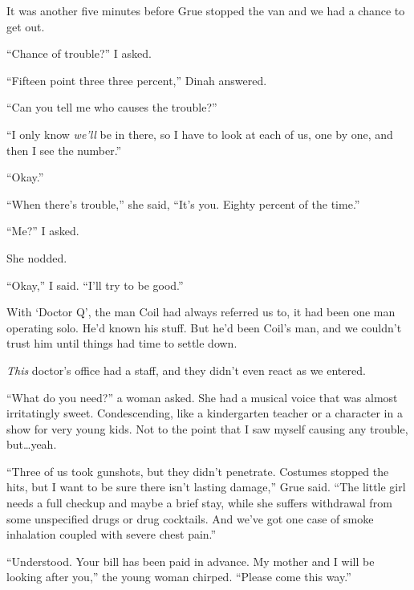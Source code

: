 It was another five minutes before Grue stopped the van and we had a chance to get out.



``Chance of trouble?'' I asked.



``Fifteen point three three percent,'' Dinah answered.



``Can you tell me who causes the trouble?''



``I only know \emph{we'll} be in there, so I have to look at each of us, one by one, and then I see the number.''



``Okay.''



``When there's trouble,'' she said, ``It's you.  Eighty percent of the time.''



``Me?'' I asked.



She nodded.



``Okay,'' I said.  ``I'll try to be good.''



With `Doctor Q', the man Coil had always referred us to, it had been one man operating solo.  He'd known his stuff.  But he'd been Coil's man, and we couldn't trust him until things had time to settle down.



\emph{This} doctor's office had a staff, and they didn't even react as we entered.



``What do you need?'' a woman asked.  She had a musical voice that was almost irritatingly sweet.  Condescending, like a kindergarten teacher or a character in a show for very young kids.  Not to the point that I saw myself causing any trouble, but\ldots yeah.



``Three of us took gunshots, but they didn't penetrate.  Costumes stopped the hits, but I want to be sure there isn't lasting damage,'' Grue said.  ``The little girl needs a full checkup and maybe a brief stay, while she suffers withdrawal from some unspecified drugs or drug cocktails.  And we've got one case of smoke inhalation coupled with severe chest pain.''



``Understood.  Your bill has been paid in advance.  My mother and I will be looking after you,'' the young woman chirped.  ``Please come this way.''



